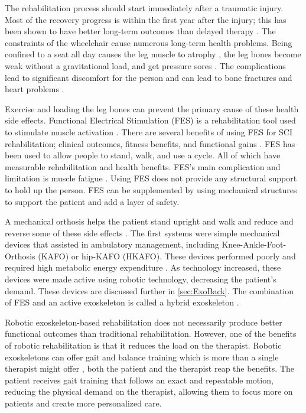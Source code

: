  
 The rehabilitation process should start immediately after a traumatic injury. Most of the recovery progress is within the first year after the injury; this has been shown to have better long-term outcomes than delayed therapy \cite{scivoletto2005early} \cite{piepmeier1988late}. The constraints of the wheelchair cause numerous long-term health problems. Being confined to a seat all day causes the leg muscle to atrophy \cite{castro1999influence}, the leg bones become weak \cite{goemaere1994bone} without a gravitational load, and get pressure sores \cite{wall2000preventing}. The complications lead to significant discomfort for the person and can lead to bone fractures and heart problems \cite{giangregorio2006bone}.  
 
 Exercise and loading the leg bones can prevent the primary cause of these health side effects. Functional Electrical Stimulation (FES) is a rehabilitation tool used to stimulate muscle activation  \cite{quintero2012preliminary}. There are several benefits of using FES for SCI rehabilitation; clinical outcomes, fitness benefits, and functional gains \cite{hamid2008role}. FES has been used to allow people to stand, walk, and use a cycle\cite{mazzoleni2013fes}. All of which have measurable rehabilitation and health benefits. FES's main complication and limitation is muscle fatigue \cite{karu1995reducing}. Using FES  does not provide any structural support to hold up the person. FES can be supplemented by using mechanical structures to support the patient and add a layer of safety. 
 
A mechanical orthosis helps the patient stand upright and walk and reduce and reverse some of these side effects \cite{palermo2017clinician}. The first systems were simple mechanical devices that assisted in ambulatory management, including Knee-Ankle-Foot-Orthosis (KAFO) or hip-KAFO (HKAFO). These devices performed poorly and required high metabolic energy expenditure \cite{del2012review}. As technology increased, these devices were made active using robotic technology, decreasing the patient's demand. These devices are discussed further in \autoref{sec:ExoBack}. The combination of FES and an active exoskeleton is called a hybrid exoskeleton \cite{ha2012enhancing} \cite{alouane2019hybrid}. 

Robotic exoskeleton-based rehabilitation does not necessarily produce better functional outcomes than traditional rehabilitation. However, one of the benefits of robotic rehabilitation is that it reduces the load on the therapist. Robotic exoskeletons can offer gait and balance training which is more than a single therapist might offer \cite{guidingLeg}, both the patient and the therapist reap the benefits. The patient receives gait training that follows an exact and repeatable motion, reducing the physical demand on the therapist, allowing them to focus more on patients and create more personalized care.  


